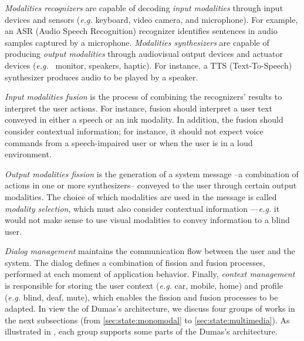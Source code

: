 \textit{Modalities recognizers} are capable of decoding \textit{input
modalities} through input devices and sensors (\textit{e.g.} keyboard, video camera, and
microphone). For example, an ASR (Audio Speech Recognition) recognizer
identifies sentences in audio samples captured by a microphone.
\textit{Modalities synthesizers} are capable of producing \textit{output
modalities} through audiovisual output devices and actuator devices (\textit{e.g.}~
monitor, speakers, haptic). For instance, a TTS (Text-To-Speech) synthesizer
produces audio to be played by a speaker.

\textit{Input modalities fusion} is the process of combining the recognizers’
results to interpret the user actions. For instance, fusion should interpret a
user text conveyed in either a speech or an ink modality. In addition, the
fusion should consider contextual information; for instance, it should not
expect voice commands from a speech-impaired user or when the user is in a loud
environment.

\textit{Output modalities fission} is the generation of a system message --a
combination of actions in one or more synthesizers-- conveyed to the user
through certain output modalities. The choice of which modalities are used in
the message is called \textit{modality selection}, which must also consider
contextual information —\textit{e.g.} it would not make sense to use visual modalities to
convey information to a blind user.

\textit{Dialog management} maintains the communication flow between the user
and the system. The dialog defines a combination of fission and fusion
processes, performed at each moment of application behavior. Finally,
\textit{context management} is responsible for storing the user context
(\textit{e.g.} car, mobile, home) and profile (\textit{e.g.} blind, deaf,
mute), which enables the fission and fusion processes to be adapted. In view
the of Dumas’s architecture, we discuss four groups of works in the next
subsections (from \ref{sec:state:monomodal} to \ref{sec:state:multimedia}). As
illustrated in , each group supports some parts of the Dumas’s
architecture.

